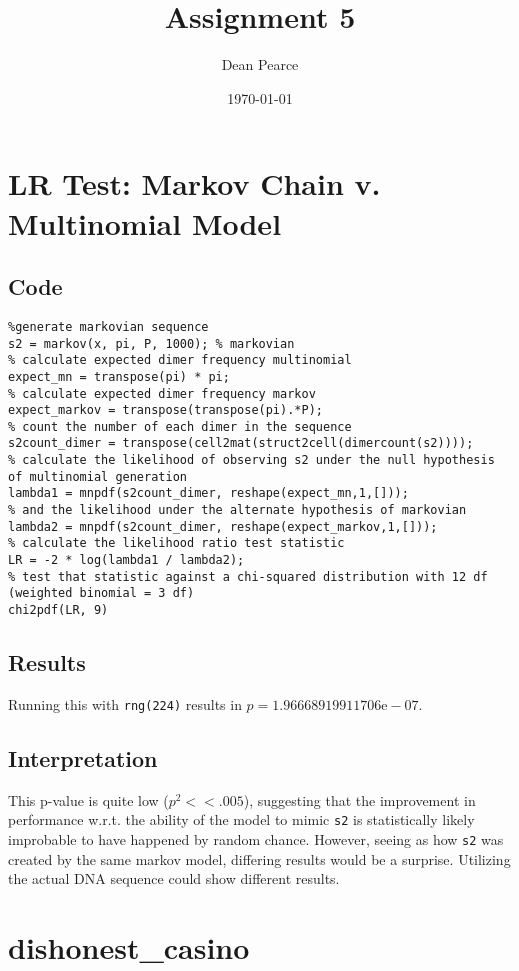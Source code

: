 \documentclass[titlepage]{scrartcl}
\title{Assignment 5}
\date{\today}
\author{Dean Pearce}
\begin{document}
\maketitle
\section{LR Test: Markov Chain v. Multinomial Model}
\subsection{Code}
\begin{verbatim}
%generate markovian sequence
s2 = markov(x, pi, P, 1000); % markovian
% calculate expected dimer frequency multinomial
expect_mn = transpose(pi) * pi;
% calculate expected dimer frequency markov
expect_markov = transpose(transpose(pi).*P);
% count the number of each dimer in the sequence
s2count_dimer = transpose(cell2mat(struct2cell(dimercount(s2))));
% calculate the likelihood of observing s2 under the null hypothesis of multinomial generation
lambda1 = mnpdf(s2count_dimer, reshape(expect_mn,1,[]));
% and the likelihood under the alternate hypothesis of markovian
lambda2 = mnpdf(s2count_dimer, reshape(expect_markov,1,[]));
% calculate the likelihood ratio test statistic
LR = -2 * log(lambda1 / lambda2);
% test that statistic against a chi-squared distribution with 12 df (weighted binomial = 3 df)
chi2pdf(LR, 9)
\end{verbatim}
\subsection{Results}
Running this with \verb+rng(224)+ results in $p=1.96668919911706\text{e}-07$.
\subsection{Interpretation}
This p-value is quite low ($p^2<<.005$), suggesting that the improvement in performance w.r.t. the ability of the model to mimic \verb+s2+ is statistically likely improbable to have happened by random chance.  However, seeing as how \verb+s2+ was created by the same markov model, differing results would be a surprise.  Utilizing the actual DNA sequence could show different results.
\section{dishonest_casino}
\end{document}

